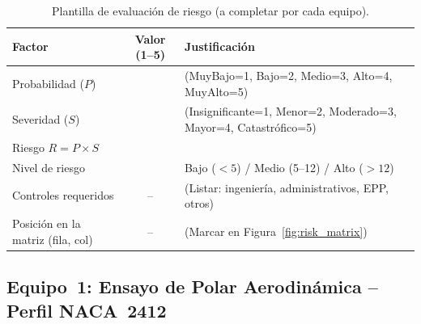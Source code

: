 \documentclass[12pt,a4paper]{article}
\begin{document}
\begin{table}[H]
	\centering
	\caption{Plantilla de evaluación de riesgo (a completar por cada equipo).}
	\label{tab:risk_template}
	\small
	\begin{tabularx}{\textwidth}{l c X}
		\toprule
		\textbf{Factor}                   & \textbf{Valor (1--5)} & \textbf{Justificación}                           \\
		\midrule
		Probabilidad ($P$)                &                       & (MuyBajo=1, Bajo=2, Medio=3, Alto=4, MuyAlto=5)  \\
		Severidad ($S$)                   &                       & (Insignificante=1, Menor=2, Moderado=3, Mayor=4,
		Catastrófico=5)                                                                                              \\
		\midrule
		Riesgo $R = P \times S$           &                       &                                                  \\
		Nivel de riesgo                   &                       & Bajo ($<5$) / Medio (5--12) / Alto ($>12$)       \\
		\midrule
		Controles requeridos              & {--}                  & (Listar: ingeniería, administrativos,
		EPP, otros)                                                                                                  \\
		Posición en la matriz (fila, col) & {--}                  & (Marcar en
		Figura~\ref{fig:risk_matrix})                                                                                \\
		\bottomrule
	\end{tabularx}
\end{table}

\subsection{Equipo~1: Ensayo de Polar Aerodinámica -- Perfil NACA~2412}
\label{sec:eq1}
\end{document}
